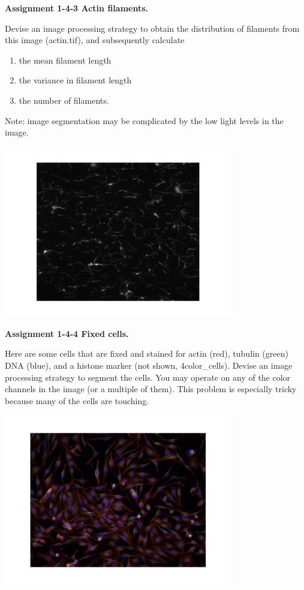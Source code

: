 \textbf{\sffamily
Assignment 1-4-3  Actin filaments.}

Devise an image processing strategy to
obtain the distribution of filaments from this image (actin.tif), and subsequently
calculate 
\begin{enumerate}
\item the mean filament length
\item the variance in filament length
\item the number of filaments. 
\end{enumerate}
Note: image segmentation may be complicated by the low light levels in the image. \\

{\centering 
\includegraphics[width=10cm]{fig/CMCIBasicCourse201102-img127.jpg}
\par}

\textbf{\sffamily
Assignment 1-4-4  Fixed cells.}

Here are some cells that are fixed and
stained for actin (red), tubulin (green) DNA (blue), and a histone
marker (not shown, 4color\_cells). Devise an image processing strategy to segment
the cells. You may operate on any of the color channels in the image
(or a multiple of them). This problem is especially tricky because
many of the cells are touching.  \\

{\centering 
\includegraphics[width=10cm]{fig/CMCIBasicCourse201102-img128.jpg}
\par}

